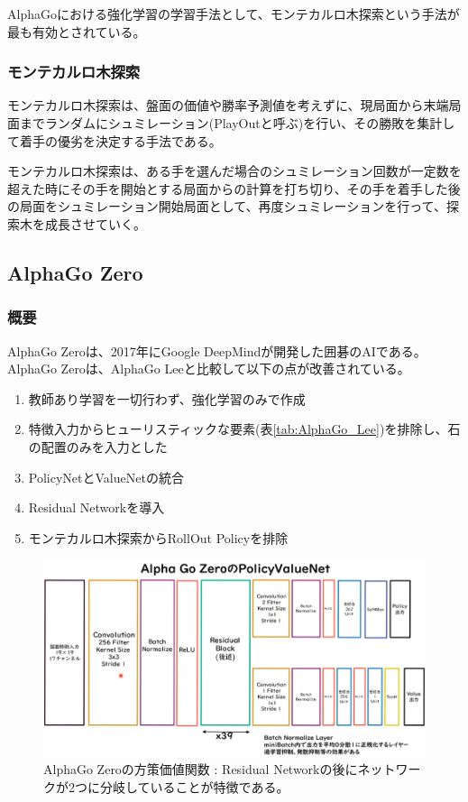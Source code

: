 \documentclass{ltjsarticle}
\begin{document}
\par
AlphaGoにおける強化学習の学習手法として、モンテカルロ木探索という手法が最も有効とされている。

\subsubsection{モンテカルロ木探索}
モンテカルロ木探索は、盤面の価値や勝率予測値を考えずに、現局面から末端局面までランダムにシュミレーション(PlayOutと呼ぶ)を行い、その勝敗を集計して着手の優劣を決定する手法である。
\par
モンテカルロ木探索は、ある手を選んだ場合のシュミレーション回数が一定数を超えた時にその手を開始とする局面からの計算を打ち切り、その手を着手した後の局面をシュミレーション開始局面として、再度シュミレーションを行って、探索木を成長させていく。

\subsection{AlphaGo Zero}
\subsubsection{概要}
AlphaGo Zeroは、2017年にGoogle DeepMindが開発した囲碁のAIである。AlphaGo Zeroは、AlphaGo Leeと比較して以下の点が改善されている。
\begin{enumerate}
  \item 教師あり学習を一切行わず、強化学習のみで作成
  \item 特徴入力からヒューリスティックな要素(表\ref{tab:AlphaGo_Lee})を排除し、石の配置のみを入力とした
  \item PolicyNetとValueNetの統合
  \item Residual Networkを導入
  \item モンテカルロ木探索からRollOut Policyを排除
\end{enumerate}
\begin{figure}[htbp]
  \centering
  \includegraphics[width=15cm]{./capture/AlphaGo_Zero_PolicyValueNet.png}
  \caption{AlphaGo Zeroの方策価値関数 : Residual Networkの後にネットワークが2つに分岐していることが特徴である。}
  \label{fig:AlphaGo_Zero}
\end{figure}
\end{document}
